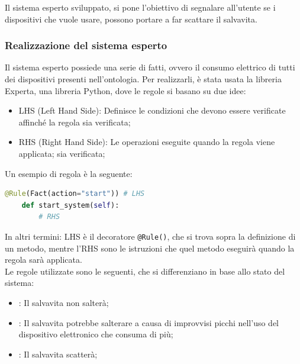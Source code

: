 \documentclass[12pt, letterpaper]{article}
\begin{document}
\noindent Il sistema esperto sviluppato, si pone l'obiettivo di segnalare all'utente
se i dispositivi che vuole usare, possono portare a far scattare il salvavita. \\


\subsubsection{Realizzazione del sistema esperto}

Il sistema esperto possiede una serie di fatti, ovvero il consumo elettrico di tutti dei dispositivi
presenti nell'ontologia. Per realizzarli, è stata usata la libreria Experta, una libreria Python, dove le regole
si basano su due idee:

\begin{itemize}
      \item LHS (Left Hand Side): Definisce le condizioni che devono essere verificate affinché la regola
            sia verificata;
      \item RHS (Right Hand Side): Le operazioni eseguite quando la regola viene applicata;
            sia verificata;
\end{itemize}

\noindent Un esempio di regola è la seguente:

\begin{lstlisting}[language=Python]
    @Rule(Fact(action="start")) # LHS
    def start_system(self):
        # RHS


\end{lstlisting}

\noindent In altri termini: LHS è il decoratore \texttt{@Rule()}, che si trova
sopra la definizione di un metodo, mentre l'RHS sono le istruzioni che quel metodo
eseguirà quando la regola sarà applicata. \\

\noindent Le regole utilizzate sono le seguenti, che si differenziano in base allo stato
del sistema:

\begin{itemize}
      \item {}: Il salvavita non salterà;
      \item {}: Il salvavita potrebbe salterare a causa di improvvisi
            picchi nell'uso del dispositivo elettronico che consuma di più;
      \item {}: Il salvavita scatterà;
\end{itemize}
\end{document}
